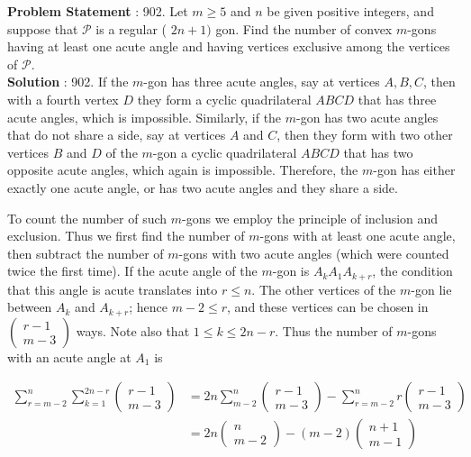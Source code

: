 \documentclass[10pt]{article}
\begin{document}
\textbf{Problem Statement} :
902. Let $m \geq 5$ and $n$ be given positive integers, and suppose that $\mathcal{P}$ is a regular ( $2 n+1)$ gon. Find the number of convex $m$-gons having at least one acute angle and having vertices exclusive among the vertices of $\mathcal{P}$.
\\
\textbf{Solution} :
902. If the $m$-gon has three acute angles, say at vertices $A, B, C$, then with a fourth vertex $D$ they form a cyclic quadrilateral $A B C D$ that has three acute angles, which is impossible. Similarly, if the $m$-gon has two acute angles that do not share a side, say at vertices $A$ and $C$, then they form with two other vertices $B$ and $D$ of the $m$-gon a cyclic quadrilateral $A B C D$ that has two opposite acute angles, which again is impossible. Therefore, the $m$-gon has either exactly one acute angle, or has two acute angles and they share a side.

To count the number of such $m$-gons we employ the principle of inclusion and exclusion. Thus we first find the number of $m$-gons with at least one acute angle, then subtract the number of $m$-gons with two acute angles (which were counted twice the first time). If the acute angle of the $m$-gon is $A_{k} A_{1} A_{k+r}$, the condition that this angle is acute translates into $r \leq n$. The other vertices of the $m$-gon lie between $A_{k}$ and $A_{k+r}$; hence $m-2 \leq r$, and these vertices can be chosen in $\left(\begin{array}{c}r-1 \\ m-3\end{array}\right)$ ways. Note also that $1 \leq k \leq 2 n-r$. Thus the number of $m$-gons with an acute angle at $A_{1}$ is

$$
\begin{aligned}
\sum_{r=m-2}^{n} \sum_{k=1}^{2 n-r}\left(\begin{array}{c}
r-1 \\
m-3
\end{array}\right) &=2 n \sum_{m-2}^{n}\left(\begin{array}{c}
r-1 \\
m-3
\end{array}\right)-\sum_{r=m-2}^{n} r\left(\begin{array}{c}
r-1 \\
m-3
\end{array}\right) \\
&=2 n\left(\begin{array}{c}
n \\
m-2
\end{array}\right)-(m-2)\left(\begin{array}{c}
n+1 \\
m-1
\end{array}\right)
\end{aligned}
$$
\end{document}
